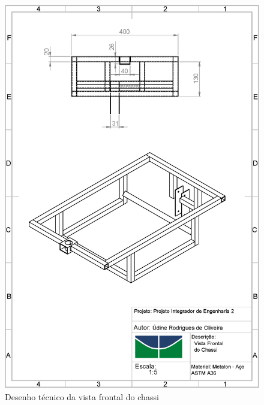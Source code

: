 \begin{apendicesenv}
\begin{figure}[!htbp]
	\centering
	\includegraphics[width=\textwidth]{figuras/chassi_frontal.eps}
	\caption{Desenho técnico da vista frontal do chassi}
\end{figure}


\end{apendicesenv}
